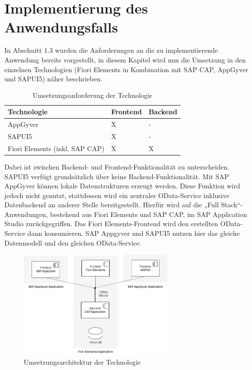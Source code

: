 
\chapter{Implementierung des Anwendungsfalls} \label{IM}


In Abschnitt 1.3 wurden die Anforderungen an die zu implementierende Anwendung bereits vorgestellt, in diesem Kapitel wird nun die Umsetzung in den einzelnen Technologien (Fiori Elements in Kombination mit SAP CAP, AppGyver und SAPUI5) näher beschrieben. 

\begin{table}[htbp]
  \centering
	\begin{tabular}{|l|l|l|} 
	\hline 
	\rowcolor{gray!40}
     Technologie&Frontend&Backend\\
	\hline  
	AppGyver&X&-\\
	\hline
	SAPUI5&X&-\\
	\hline
	Fiori Elements (inkl. SAP CAP)&X&X\\
	\hline
	\end{tabular}
  \caption{Umsetzungsanforderung der Technologie} 
\end{table}

Dabei ist zwischen Backend- und Frontend-Funktionalität zu unterscheiden. SAPUI5 verfügt grundsätzlich über keine Backend-Funktionalität. Mit SAP AppGyver können lokale Datenstrukturen erzeugt werden. Diese Funktion wird jedoch nicht genutzt, stattdessen wird ein zentraler OData-Service inklusive Datenbackend an anderer Stelle bereitgestellt. Hierfür wird auf die „Full Stack“-Anwendungen, bestehend aus Fiori Elements und SAP CAP, im SAP Application Studio zurückgegriffen. Das Fiori Elements-Frontend wird den erstellten OData-Service dann konsumieren. SAP Appgyver und SAPUI5 nutzen hier das gleiche Datenmodell und den gleichen OData-Service. 

\begin{figure}[htbp]
 \centering
 \includegraphics[width=0.7\textwidth]{Bilder/architecture/apps_architektur.jpg}
 \caption{Umsetzungsarchitektur der Technologie}
\end{figure}

